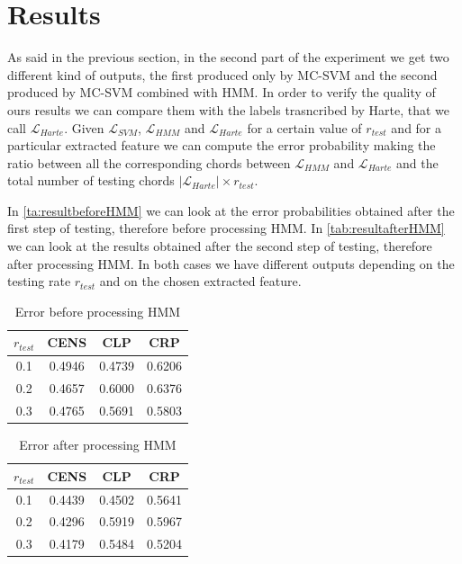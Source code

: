 \section{Results}
\label{sec:results}


As said in the previous section, in the second part of the experiment we get two different kind of outputs, the first produced only by MC-SVM and the second produced by MC-SVM combined with HMM. In order to verify the quality of ours results we can compare them with the labels trasncribed by Harte, that we call $\mathcal{L}_{Harte}$. Given $\mathcal{L}_{SVM}$, $\mathcal{L}_{HMM}$ and $\mathcal{L}_{Harte}$ for a certain value of $r_{test}$ and for a particular extracted feature we can compute the error probability making the ratio between all the corresponding chords between $\mathcal{L}_{HMM}$ and $\mathcal{L}_{Harte}$ and the total number of testing chords $|\mathcal{L}_{Harte}| \times r_{test}$. 


 In \ref{ta:resultbeforeHMM} we can look at the error probabilities obtained after the first step of testing, therefore before processing HMM. In \ref{tab:resultafterHMM} we can look at the results obtained after the second step of testing, therefore after processing HMM. In both cases we have different outputs depending on the testing rate $r_{test}$ and on the chosen extracted feature.

\begin{table}[h!]
	\caption{Error before processing HMM}
	\centering
	\begin{tabular}{|c |c c c|}
	\hline
	$r_{test}$ & CENS & CLP & CRP\\ \hline
	0.1 & 0.4946 & 0.4739 & 0.6206\\
	0.2 & 0.4657 & 0.6000 & 0.6376\\
	0.3 & 0.4765 & 0.5691 & 0.5803\\
	\hline
	\end{tabular}
	\label{tab:resultbeforeHMM}
\end{table}

\begin{table}[h!]
	\caption{Error after processing HMM}
	\centering
	\begin{tabular}{|c |c c c|}
	\hline
	$r_{test}$ & CENS & CLP & CRP\\ \hline
	0.1 & 0.4439 & 0.4502 & 0.5641\\
	0.2 & 0.4296 & 0.5919 & 0.5967\\
	0.3 & 0.4179 & 0.5484 & 0.5204\\
	\hline
	\end{tabular}
	\label{ta:resultafterHMM}
\end{table}

